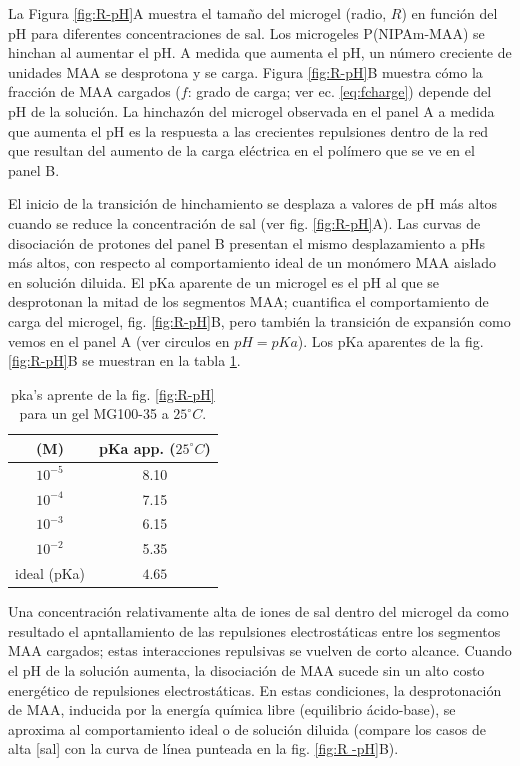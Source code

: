 La Figura \ref{fig:R-pH}A muestra el tama\~no del microgel (radio, $R$) en funci\'on del pH para diferentes concentraciones de sal.
Los microgeles P(NIPAm-MAA) se hinchan al aumentar el pH.
A medida que aumenta el pH, un n\'umero creciente de unidades MAA se desprotona y se carga.
Figura \ref{fig:R-pH}B muestra c\'omo la fracci\'on de MAA cargados ($f$: grado de carga; ver ec. \ref{eq:fcharge}) depende del pH de la soluci\'on.
La hinchaz\'on del microgel observada en el panel A a medida que aumenta el pH es la respuesta a las crecientes repulsiones dentro de la red que resultan del aumento de la carga el\'ectrica en el pol\'imero que se ve en el panel B.


El inicio de la transici\'on de hinchamiento se desplaza a valores de pH m\'as altos cuando se reduce la concentraci\'on de sal (ver fig. \ref{fig:R-pH}A).
Las curvas de disociaci\'on de protones del panel B presentan el mismo desplazamiento a pHs m\'as altos, con respecto al comportamiento ideal de un mon\'omero MAA aislado en soluci\'on diluida.
El pKa aparente de un microgel es el pH al que se desprotonan la mitad de los segmentos MAA;
cuantifica el comportamiento de carga del microgel, fig. \ref{fig:R-pH}B, pero tambi\'en la transici\'on de expansi\'on como vemos en el panel A (ver circulos en $pH=pKa$).
Los pKa aparentes de la fig. \ref{fig:R-pH}B se muestran en la tabla \ref{table:pKa_app}.

\begin{table}[!htb]
\small
  \begin{tabular}{|cc|}
    \hline
      [NaCl] (M)&  pKa app. ($25 ^\circ C$)  \\
      \hline
    $10^{-5}$ & 8.10  \\
    $10^{-4}$ & 7.15 \\
    $10^{-3}$ & 6.15 \\
    $10^{-2}$ & 5.35 \\
    ideal (pKa) &  $4.65$  \\
    \hline
  \end{tabular}
 \caption{ pka's aprente de la fig. \ref{fig:R-pH} para un gel MG100-35 a $25 ^\circ C$.}
\label{table:pKa_app} 
\end{table}


Una concentraci\'on relativamente alta de iones de sal dentro del microgel da como resultado el apntallamiento de las repulsiones electrost\'aticas entre los segmentos MAA cargados; estas interacciones repulsivas se vuelven de corto alcance.
Cuando el pH de la soluci\'on aumenta, la disociación de MAA sucede sin un alto costo energ\'etico de repulsiones electrost\'aticas.
En estas condiciones, la desprotonaci\'on de MAA, inducida por la energ\'ia qu\'imica libre (equilibrio \'acido-base), se aproxima al comportamiento ideal o de soluci\'on diluida (compare los casos de alta [sal] con la curva de l\'inea punteada en la fig. \ref{fig:R -pH}B).



